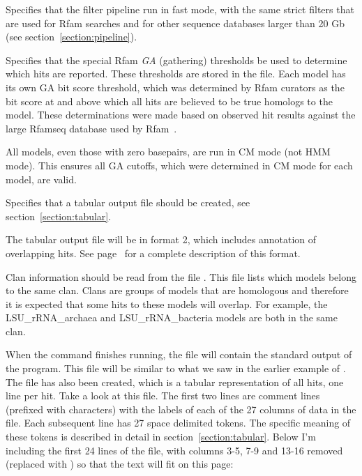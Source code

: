 \begin{sreitems}{}
\item[\otext{--rfam}] Specifies that the filter pipeline run in fast
  mode, with the same strict filters that are used for Rfam searches
  and for other sequence databases larger than 20 Gb (see
  section~\ref{section:pipeline}). 
%
\item[\otext{--cut\_ga}] Specifies that the special Rfam \emph{GA}
  (gathering) thresholds be used to determine which hits are
  reported. These thresholds are stored in the  file.
  Each model has its own GA bit score threshold, which was determined
  by Rfam curators as the bit score at and above which all hits are
  believed to be true homologs to the model. These determinations were made based on
  observed hit results against the large Rfamseq database used by
  Rfam~\citep{Nawrocki15}.
%
\item[\otext{--nohmmonly}] All models, even those with zero basepairs,
  are run in CM mode (not HMM mode). This ensures all GA cutoffs, which were
  determined in CM mode for each model, are valid.
%
\item[\otext{--tblout}] Specifies that a tabular output
  file should be created, see section~\ref{section:tabular}.
%
\item[\otext{--fmt 2}] The tabular output file will be in format 2,
  which includes annotation of overlapping hits. See
  page~\pageref{tabular-format2} for a complete description of this
  format. 
%
\item[\otext{--clanin}] Clan information should be read
  from the file . This file lists
  which models belong to the same clan. Clans are groups of models
  that are homologous and therefore it is expected that some hits to
  these models will overlap. For example, the LSU\_rRNA\_archaea and
  LSU\_rRNA\_bacteria models are both in the same clan.
%
\end{sreitems}

When the  command finishes running, the file
 will contain the standard output of the
program. This file will be similar to what we saw in the earlier example of
. The file  has also been
created, which is a tabular representation of all hits, one line per
hit.  Take a look at this file. The first two lines are comment lines
(prefixed with \prog{\#} characters) with the labels of each of the 27
columns of data in the file. Each subsequent line has 27 space
delimited tokens. The specific meaning of these tokens is described in
detail in section~\ref{section:tabular}.  Below I'm including the
first 24 lines of the file, with columns 3-5, 7-9 and 13-16 removed
(replaced with ) so that the text will fit on this page:

